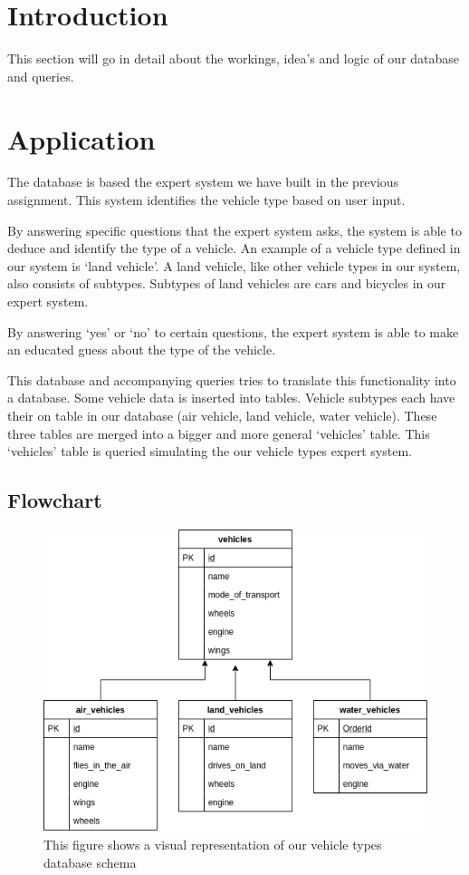 \section{Introduction} \label{man-introduction}
This section will go in detail about the workings, idea's and logic of our
database and queries.

\section{Application} \label{man-application}
The database is based the expert system we have built in the previous
assignment. This system identifies the vehicle type based on user input.

By answering specific questions that the expert system asks,
the system is able to deduce and identify the type of a vehicle.
An example of a vehicle type defined in our system is `land vehicle'.
A land vehicle, like other vehicle types in our system, also consists
of subtypes. Subtypes of land vehicles are cars and bicycles in our expert system.

By answering `yes' or `no' to certain questions,
the expert system is able to make an educated
guess about the type of the vehicle.

This database and accompanying queries tries to translate this functionality
into a database. Some vehicle data is inserted into tables. Vehicle subtypes
each have their on table in our database (air vehicle, land vehicle,
water vehicle). These three tables are merged into a bigger and more general
`vehicles' table. This `vehicles' table is queried simulating the our vehicle
types expert system.

\subsection{Flowchart} \label{man-diagram-application}
\begin{figure}[H]
  \includegraphics[width=\linewidth]{images/VehicleTypesRTables.png}
  \caption{This figure shows a visual representation of our vehicle types database schema}
\end{figure}

